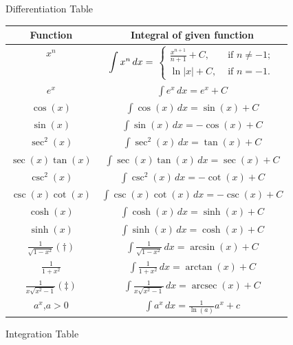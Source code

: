 \documentclass[12pt]{article}
\DeclareMathOperator{\arcsec}{arcsec}
\begin{document}
\begin{figure}[htb]
\begin{minipage}[b]{0.5\textwidth}
\begin{tabular}{|c|c|}
\end{tabular}
\caption{Differentiation Table} 
\end{minipage}%
  \begin{minipage}[b]{0.5\textwidth} 
    \centering 
\renewcommand\arraystretch{1.5}
\begin{tabular}{|c|c|}
\hline
Function                                  & Integral of given function \\ \hline
$x^n$    					 	& \begin{minipage}{7.88cm} \vspace{0.2cm}\centering $\mathop{\mathlarger{\int}} x^n\, dx=$ 
$
\begin{cases}
\frac{x^{n+1}}{n+1} +C,  &  \text{ if }n \neq -1;\\
\ln|x| +C,                          &  \text{ if }n= -1.
\end{cases}
$\vspace{0.2cm}\end{minipage}
                \\ \hline
$e^{x}$                                       & $\int e^x \,dx = e^x +C$                    \\ \hline
$\cos(x)$                                       & $\int \cos(x) \, dx= \sin(x)+C$                    \\ \hline
$\sin(x)$                                       & $\int \sin(x) \, dx= -\cos(x)+C$                    \\ \hline
$\sec^2(x)$                                       & $\int \sec^2(x) \, dx= \tan(x)+C$                   \\ \hline
$\sec(x) \tan(x)$                                      & $\int \sec(x) \tan(x) \, dx= \sec(x)+C$                  \\ \hline
 $\csc^2(x)$                                  &$\int \csc^2(x) \, dx= -\cot(x)+C$                  \\ \hline
$\csc(x) \cot(x)$                                      &$\int \csc(x) \cot(x) \, dx= -\csc(x)+C$            \\ \hline
$\cosh(x)$                                      &$\int \cosh(x) \, dx= \sinh(x)+C$         \\ \hline
$\sinh(x)$                                       &$\int \sinh(x) \, dx= \cosh(x)+C$        \\ \hline
$\frac{1}{\sqrt{1-x^2}}$$(\dag)$                 &$\int \frac{1}{\sqrt{1-x^2}} \, dx= \arcsin(x)+C$        \\ \hline
$\frac{1}{1+x^2}$                          &$\int \frac{1}{1+x^2} \, dx= \arctan(x)+C$        \\ \hline
$\frac{1}{x \sqrt{x^2-1}}$$(\ddag)$           &$\int \frac{1}{x \sqrt{x^2-1}} \, dx= \arcsec(x)+C$        \\ \hline
$a^x$,$a>0$                                                      &$\int a^x \, dx= \frac{1}{\ln(a)} a^x+c$        \\ \hline

   \end{tabular}
\caption{Integration Table} 
  \end{minipage} 
\end{figure}
\end{document}
